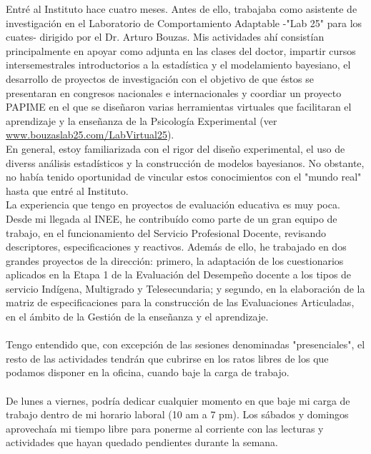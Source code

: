 \documentclass[11pt]{article}
\begin{document}
\begin{question}
Entré al Instituto hace cuatro meses. Antes de ello, trabajaba como asistente de investigación en el Laboratorio de Comportamiento Adaptable -"Lab 25" para los cuates- dirigido por el Dr. Arturo Bouzas. Mis actividades ahí consistían principalmente en apoyar como adjunta en las clases del doctor, impartir cursos intersemestrales introductorios a la estadística y el modelamiento bayesiano, el desarrollo de proyectos de investigación con el objetivo de que éstos se presentaran en congresos nacionales e internacionales y coordiar un proyecto PAPIME en el que se diseñaron varias herramientas virtuales que facilitaran el aprendizaje y la enseñanza de la Psicología Experimental (ver \href{http://www.bouzaslab25.com/LabVirtual25}{www.bouzaslab25.com/LabVirtual25}).\\

En general, estoy familiarizada con el rigor del diseño experimental, el uso de diverss análisis estadísticos y la construcción de modelos bayesianos. No obstante, no había tenido oportunidad de vincular estos conocimientos con el "mundo real" hasta que entré al Instituto.\\

La experiencia que tengo en proyectos de evaluación educativa es muy poca. Desde mi llegada al INEE, he contribuído como parte de un gran equipo de trabajo, en el funcionamiento del Servicio Profesional Docente, revisando descriptores, especificaciones y reactivos. Además de ello, he trabajado en dos grandes proyectos de la dirección: primero, la adaptación de los cuestionarios aplicados en la Etapa 1 de la Evaluación del Desempeño docente a los tipos de servicio Indígena, Multigrado y Telesecundaria; y segundo, en la elaboración de la matriz de especificaciones para la construcción de las Evaluaciones Articuladas, en el ámbito de la Gestión de la enseñanza y el aprendizaje.\\

\\
Tengo entendido que, con excepción de las sesiones denominadas "presenciales", el resto de las actividades tendrán que cubrirse en los ratos libres de los que podamos disponer en la oficina, cuando baje la carga de trabajo.\\

\\
De lunes a viernes, podría dedicar cualquier momento en que baje mi carga de trabajo dentro de mi horario laboral (10 am a 7 pm). Los sábados y domingos aprovechaía mi tiempo libre para ponerme al corriente con las lecturas y actividades que hayan quedado pendientes durante la semana.\\


\end{question}
\end{document}
